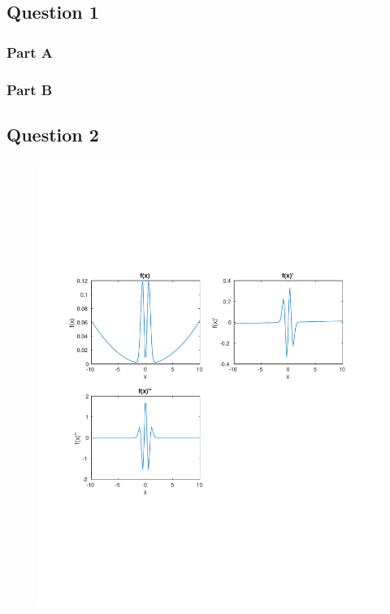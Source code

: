 \subsection{Question 1}



\newpage
\subsubsection{Part A}



\subsubsection{Part B}



\newpage
\subsection{Question 2}

\begin{figure}[th]
  \centering
\includegraphics[trim=10mm 70mm 10mm 70mm, width=1.0\textwidth]{../q2_plots}
\end{figure}

